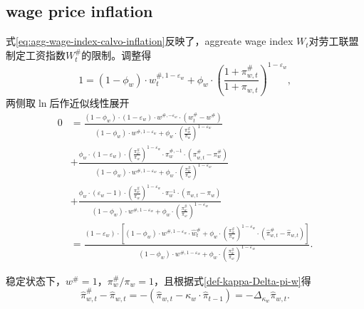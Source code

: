 \subsection{wage price inflation}
\label{sec:union-wage-agg-union-lin}
式\eqref{eq:agg-wage-index-calvo-inflation}反映了，aggreate wage index $W_t$对劳工联盟制定工资指数$W^{\#}_t$的限制。调整得
\begin{equation*}
1 = \left( 1- \phi_w \right) \cdot w_t^{\#,1-\varepsilon_w} + \phi_w \cdot \left( \frac{1+\pi^{\#}_{w,t}}{1+\pi_{w,t}} \right)^{1-\varepsilon_w},
\end{equation*}
两侧取$\ln$后作近似线性展开
\begin{align}
\label{union-wage-inflation-index-lin-interm}
0 &= \frac{\left(1-\phi_w \right) \cdot \left(1-\varepsilon_w \right) \cdot w^{\#,-\varepsilon_w} \cdot \left(w^{\#}_t - w^{\#}\right)}{\left(1-\phi_w\right) \cdot w^{\#,1-\varepsilon_w} + \phi_w \cdot \left( \frac{\pi^{\#}_{w}}{\pi_{w}} \right)^{1-\varepsilon_w}} \nonumber \\
&+ \frac{\phi_w \cdot \left(1-\varepsilon_w \right) \cdot \left( \frac{\pi^{\#}_{w}}{\pi_{w}} \right)^{1-\varepsilon_w} \cdot \pi^{\#,-1}_{w} \cdot \left(\pi^{\#}_{w,t}-\pi^{\#}_{w}\right)}{\left(1-\phi_w\right) \cdot w^{\#,1-\varepsilon_w} + \phi_w \cdot \left( \frac{\pi^{\#}_{w}}{\pi_{w}} \right)^{1-\varepsilon_w}}  \nonumber \\
&+ \frac{\phi_w \cdot \left(\varepsilon_w -1 \right) \cdot \left( \frac{\pi^{\#}_{w}}{\pi_{w}} \right)^{1-\varepsilon_w} \cdot \pi^{-1}_{w} \cdot \left(\pi_{w,t}-\pi_{w}\right)}{\left(1-\phi_w\right) \cdot w^{\#,1-\varepsilon_w} + \phi_w \cdot \left( \frac{\pi^{\#}_{w}}{\pi_{w}} \right)^{1-\varepsilon_w}}  \nonumber \\
&= \frac{  \left(1-\varepsilon_w \right) \cdot \left[ (1-\phi_w) \cdot w^{\#, 1-\varepsilon_w} \cdot \hat{w}^{\#}_t + \phi_w \cdot \left(\frac{\pi^{\#}_{w}}{\pi_w}\right)^{1-\varepsilon_w} \cdot \left(\hat{\pi}^{\#}_{w,t} - \hat{\pi}_{w,t} \right) \right] }{\left(1-\phi_w\right) \cdot w^{\#,1-\varepsilon_w} + \phi_w \cdot \left( \frac{\pi^{\#}_{w}}{\pi_{w}} \right)^{1-\varepsilon_w}}.
\end{align}


稳定状态下，$w^{\#}=1$，$\pi^{\#}_{w}/\pi_{w}=1$，且根据式\eqref{def-kappa-Delta-pi-w}得
\begin{equation*}
\hat{\pi}^{\#}_{w,t}-\hat{\pi}_{w,t} = -\left(\hat{\pi}_{w,t} - \kappa_w \cdot \hat{\pi}_{t-1} \right) = -\Delta_{\kappa_w}\hat{\pi}_{w,t}.
\end{equation*}

